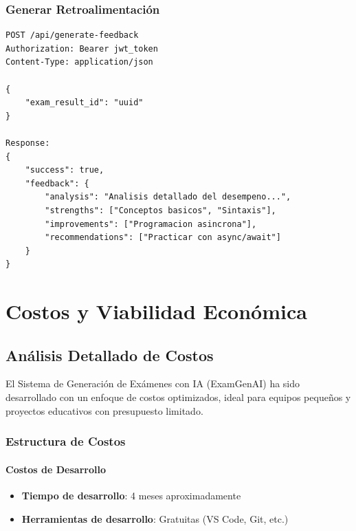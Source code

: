 \documentclass[12pt,a4paper]{report}
\begin{document}
\subsection{Generar Retroalimentación}
\begin{lstlisting}
POST /api/generate-feedback
Authorization: Bearer jwt_token
Content-Type: application/json

{
    "exam_result_id": "uuid"
}

Response:
{
    "success": true,
    "feedback": {
        "analysis": "Analisis detallado del desempeno...",
        "strengths": ["Conceptos basicos", "Sintaxis"],
        "improvements": ["Programacion asincrona"],
        "recommendations": ["Practicar con async/await"]
    }
}
\end{lstlisting}

\chapter{Costos y Viabilidad Económica}

\section{Análisis Detallado de Costos}

El Sistema de Generación de Exámenes con IA (ExamGenAI) ha sido desarrollado con un enfoque de costos optimizados, ideal para equipos pequeños y proyectos educativos con presupuesto limitado.

\subsection{Estructura de Costos}

\subsubsection{Costos de Desarrollo}
\begin{itemize}
    \item \textbf{Tiempo de desarrollo}: 4 meses aproximadamente
    \item \textbf{Herramientas de desarrollo}: Gratuitas (VS Code, Git, etc.)
\end{itemize}
\end{document}
